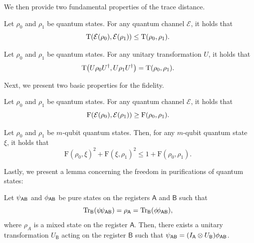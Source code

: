 \documentclass[11pt, a4paper]{article}
\numberwithin{equation}{section}
\numberwithin{figure}{section}
\DeclarePairedDelimiter\rbra{\lparen}{\rparen}
\let\ket\relax\DeclarePairedDelimiter\ket{\lvert}{\rangle}
\let\bra\relax\DeclarePairedDelimiter\bra{\langle}{\rvert}
\newcommand{\ketbra}[2]{\ensuremath{\ket{#1}\!\bra{#2}}}
\newcommand{\Tr}{\mathrm{Tr}}
\newcommand{\td}{\mathrm{T}}
\newcommand{\F}{\mathrm{F}}
\newcommand{\calE}{\mathcal{E}}
\newcommand{\sfA}{\mathsf{A}}
\newcommand{\sfB}{\mathsf{B}}
\begin{document}
We then provide two fundamental properties of the trace distance.

\begin{lemma}
    \label{lemma:trace-distance-data-processing}
    Let $\rho_0$ and $\rho_1$ be quantum states. For any quantum channel $\calE$, it holds that
    \[ \td\rbra*{\calE(\rho_0), \calE(\rho_1)} \leq \td(\rho_0,\rho_1). \]
\end{lemma}

\begin{lemma}
    \label{lemma:trace-distance-unitary-invariance}
    Let $\rho_0$ and $\rho_1$ be quantum states. For any unitary transformation $U$, it holds that
    \[ \td\rbra*{U\rho_0 U^{\dagger}, U\rho_1 U^{\dagger}} = \td(\rho_0,\rho_1). \]
\end{lemma}

Next, we present two basic properties for the fidelity. 

\begin{lemma}
    \label{lemma:fidelity-data-processing}
    Let $\rho_0$ and $\rho_1$ be quantum states. For any quantum channel $\calE$, it holds that
    \[ \F\rbra*{\calE(\rho_0), \calE(\rho_1)} \geq \F(\rho_0,\rho_1). \]
\end{lemma}

\begin{lemma}
    \label{lemma:sum-of-squared-fidelity}
    Let $\rho_0$ and $\rho_1$ be $m$-qubit quantum states. Then, for any $m$-qubit quantum state $\xi$, it holds that
    \[ \F(\rho_0,\xi)^2 + \F(\xi,\rho_1)^2 \leq 1 + \F(\rho_0,\rho_1). \]
\end{lemma}

Lastly, we present a lemma concerning the freedom in purifications of quantum states: 
\begin{lemma}
    \label{lemma:unitary-equivalent-in-purifications}
    Let $\ket{\psi}_{\sfA\sfB}$ and $\ket{\phi}_{\sfA\sfB}$ be pure states on the registers $\sfA$ and $\sfB$ such that 
    \[\Tr_{\sfB}\rbra*{\ketbra{\psi}{\psi}_{\sfA\sfB}} = \rho_{\sfA} = \Tr_{\sfB}\rbra*{\ketbra{\phi}{\phi}_{\sfA\sfB}},\] where $\rho_A$ is a mixed state on the register $\sfA$. Then, there exists a unitary transformation $U_{\sfB}$ acting on the register $\sfB$ such that $\ket{\psi}_{\sfA\sfB} = \rbra*{I_{\sfA} \otimes U_{\sfB}} \ket{\phi}_{\sfA\sfB}$. 
\end{lemma}
\end{document}

